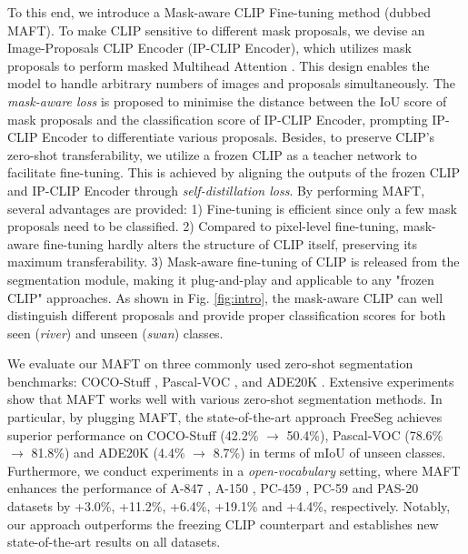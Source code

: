 To this end, we introduce a Mask-aware CLIP Fine-tuning method (dubbed MAFT). To make CLIP sensitive to different mask proposals, we devise an Image-Proposals CLIP Encoder (IP-CLIP Encoder), which utilizes mask proposals to perform masked Multihead Attention \cite{cheng2021maskformer, cheng2021mask2former}. This design enables the model to handle arbitrary numbers of images and proposals simultaneously. The \textit{mask-aware loss} is proposed to minimise the distance between the IoU score of mask proposals and the classification score of IP-CLIP Encoder, prompting IP-CLIP Encoder to differentiate various proposals. 
Besides, to preserve CLIP's zero-shot transferability, we utilize a frozen CLIP as a teacher network to facilitate fine-tuning. This is achieved by aligning the outputs of the frozen CLIP and IP-CLIP Encoder through \textit{self-distillation loss}.
By performing MAFT, several advantages are provided: 1) Fine-tuning is efficient since only a few mask proposals need to be classified. 2) Compared to pixel-level fine-tuning, mask-aware fine-tuning hardly alters the structure of CLIP itself, preserving its maximum transferability. 3) Mask-aware fine-tuning of CLIP is released from the segmentation module, making it plug-and-play and applicable to any "frozen CLIP" approaches. As shown in Fig. \ref{fig:intro}, the mask-aware CLIP can well distinguish different proposals and provide proper classification scores for both seen (\textit{river}) and unseen (\textit{swan}) classes.


We evaluate our MAFT on three commonly used zero-shot segmentation benchmarks: COCO-Stuff \cite{coco}, Pascal-VOC \cite{pascal}, and ADE20K \cite{ade20k}. Extensive experiments show that MAFT works well with various zero-shot segmentation methods. In particular, by plugging MAFT, the state-of-the-art approach FreeSeg \cite{freeseg} achieves superior performance on COCO-Stuff (42.2\% $\rightarrow$ 50.4\%), Pascal-VOC (78.6\% $\rightarrow$ 81.8\%) and ADE20K (4.4\% $\rightarrow$ 8.7\%) in terms of mIoU of unseen classes. Furthermore, we conduct experiments in a \textit{open-vocabulary} setting, where MAFT enhances the performance of A-847 \cite{ade20k}, A-150 \cite{ade20k}, PC-459 \cite{pc}, PC-59 \cite{pc} and PAS-20 \cite{pascal} datasets by +3.0\%, +11.2\%, +6.4\%, +19.1\% and +4.4\%, respectively.
Notably, our approach outperforms the freezing CLIP counterpart and establishes new state-of-the-art results on all datasets.



